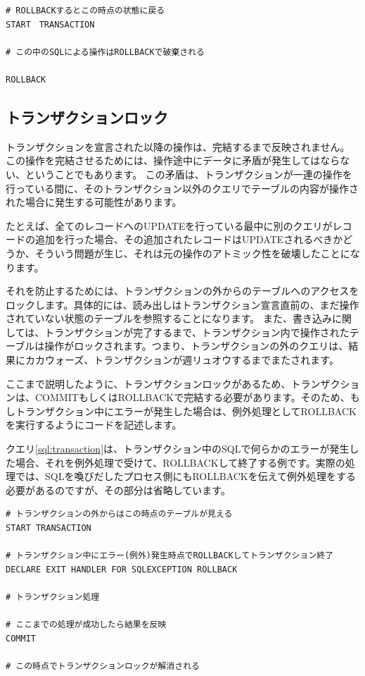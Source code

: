 \begin{lstlisting}[caption=ロールバックで終わる場合,label=sql:rollback]
# ROLLBACKするとこの時点の状態に戻る
START　TRANSACTION

# この中のSQLによる操作はROLLBACKで破棄される

ROLLBACK
\end{lstlisting}

\subsection{トランザクションロック}
トランザクションを宣言された以降の操作は、完結するまで反映されません。
この操作を完結させるためには、操作途中にデータに矛盾が発生してはならない、ということでもあります。
この矛盾は、トランザクションが一連の操作を行っている間に、そのトランザクション以外のクエリでテーブルの内容が操作された場合に発生する可能性があります。

たとえば、全てのレコードへのUPDATEを行っている最中に別のクエリがレコードの追加を行った場合、その追加されたレコードはUPDATEされるべきかどうか、そういう問題が生じ、それは元の操作のアトミック性を破壊したことになります。

それを防止するためには、トランザクションの外からのテーブルへのアクセスをロックします。具体的には、読み出しはトランザクション宣言直前の、まだ操作されていない状態のテーブルを参照することになります。
また、書き込みに関しては、トランザクションが完了するまで、トランザクション内で操作されたテーブルは操作がロックされます。つまり、トランザクションの外のクエリは、結果にカカウォーズ、トランザクションが週リュオウするまでまたされます。

ここまで説明したように、トランザクションロックがあるため、トランザクションは、COMMITもしくはROLLBACKで完結する必要があります。そのため、もしトランザクション中にエラーが発生した場合は、例外処理としてROLLBACKを実行するようにコードを記述します。

クエリ\ref{sql:transaction}は、トランザクション中のSQLで何らかのエラーが発生した場合、それを例外処理で受けて、ROLLBACKして終了する例です。実際の処理では、SQLを喚びだしたプロセス側にもROLLBACKを伝えて例外処理をする必要があるのですが、その部分は省略しています。

\begin{lstlisting}[caption=トランザクションロックとエラー処理,label=sql:transaction]
# トランザクションの外からはこの時点のテーブルが見える
START TRANSACTION

# トランザクション中にエラー(例外)発生時点でROLLBACKしてトランザクション終了
DECLARE EXIT HANDLER FOR SQLEXCEPTION ROLLBACK

# トランザクション処理

# ここまでの処理が成功したら結果を反映
COMMIT

# この時点でトランザクションロックが解消される

\end{lstlisting}